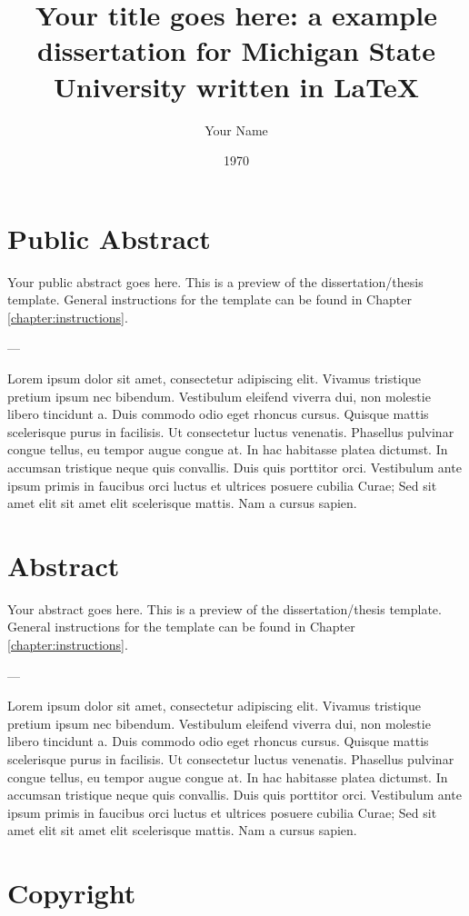 \documentclass[dissertation]{msudissertation}
\author{Your Name}
\title{Your title goes here: a example dissertation for Michigan State University written in \LaTeX}
\date{1970}
\begin{document}
\frontmatter
\maketitle

\chapter{Public Abstract}

Your public abstract goes here.  This is a preview of the dissertation/thesis template.  General instructions for the template can be found in Chapter \ref{chapter:instructions}.

---

Lorem ipsum dolor sit amet, consectetur adipiscing elit. Vivamus tristique pretium ipsum nec bibendum. Vestibulum eleifend viverra dui, non molestie libero tincidunt a. Duis commodo odio eget rhoncus cursus. Quisque mattis scelerisque purus in facilisis. Ut consectetur luctus venenatis. Phasellus pulvinar congue tellus, eu tempor augue congue at. In hac habitasse platea dictumst. In accumsan tristique neque quis convallis. Duis quis porttitor orci. Vestibulum ante ipsum primis in faucibus orci luctus et ultrices posuere cubilia Curae; Sed sit amet elit sit amet elit scelerisque mattis. Nam a cursus sapien.

\chapter{Abstract}

Your abstract goes here.  This is a preview of the dissertation/thesis template.  General instructions for the template can be found in Chapter \ref{chapter:instructions}.

---

Lorem ipsum dolor sit amet, consectetur adipiscing elit. Vivamus tristique pretium ipsum nec bibendum. Vestibulum eleifend viverra dui, non molestie libero tincidunt a. Duis commodo odio eget rhoncus cursus. Quisque mattis scelerisque purus in facilisis. Ut consectetur luctus venenatis. Phasellus pulvinar congue tellus, eu tempor augue congue at. In hac habitasse platea dictumst. In accumsan tristique neque quis convallis. Duis quis porttitor orci. Vestibulum ante ipsum primis in faucibus orci luctus et ultrices posuere cubilia Curae; Sed sit amet elit sit amet elit scelerisque mattis. Nam a cursus sapien.

\chapter{Copyright}
\end{document}
